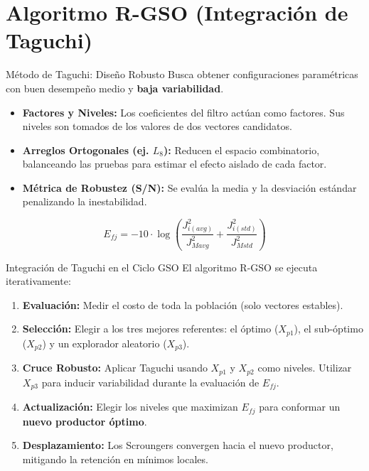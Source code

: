 \documentclass[10pt]{beamer}
\begin{document}
\section{Algoritmo R-GSO (Integración de Taguchi)}

\begin{frame}{Método de Taguchi: Diseño Robusto}
  Busca obtener configuraciones paramétricas con buen desempeño medio y \textbf{baja variabilidad}.
  \begin{itemize}
    \item \textbf{Factores y Niveles:} Los coeficientes del filtro actúan como factores. Sus niveles son tomados de los valores de dos vectores candidatos.
    \item \textbf{Arreglos Ortogonales (ej. $L_8$):} Reducen el espacio combinatorio, balanceando las pruebas para estimar el efecto aislado de cada factor.
    \item \textbf{Métrica de Robustez (S/N):} Se evalúa la media y la desviación estándar penalizando la inestabilidad.
  \end{itemize}
  \begin{equation}
    E_{fj} = -10 \cdot \log \left( \frac{J_{i(avg)}^2}{J_{Mavg}^2} + \frac{J_{i(std)}^2}{J_{Mstd}^2} \right)
  \end{equation}
\end{frame}

\begin{frame}{Integración de Taguchi en el Ciclo GSO}
  El algoritmo R-GSO se ejecuta iterativamente:
  \begin{enumerate}
    \item \textbf{Evaluación:} Medir el costo de toda la población (solo vectores estables).
    \item \textbf{Selección:} Elegir a los tres mejores referentes: el óptimo ($X_{p1}$), el sub-óptimo ($X_{p2}$) y un explorador aleatorio ($X_{p3}$).
    \item \textbf{Cruce Robusto:} Aplicar Taguchi usando $X_{p1}$ y $X_{p2}$ como niveles. Utilizar $X_{p3}$ para inducir variabilidad durante la evaluación de $E_{fj}$.
    \item \textbf{Actualización:} Elegir los niveles que maximizan $E_{fj}$ para conformar un \textbf{nuevo productor óptimo}.
    \item \textbf{Desplazamiento:} Los Scroungers convergen hacia el nuevo productor, mitigando la retención en mínimos locales.
  \end{enumerate}
\end{frame}
\end{document}
